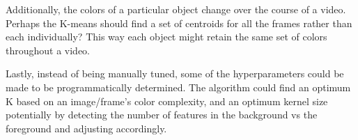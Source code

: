 \documentclass[11pt]{article}
\begin{document}
Additionally, the colors of a particular object change over the course of a video.
Perhaps the K-means should find a set of centroids for all the frames rather than each individually?
This way each object might retain the same set of colors throughout a video.

Lastly, instead of being manually tuned, some of the hyperparameters could be made to be programmatically determined.
The algorithm could find an optimum K based on an image/frame's color complexity,
and an optimum kernel size potentially by detecting the number of features in the background vs the foreground
and adjusting accordingly.


\end{document}
